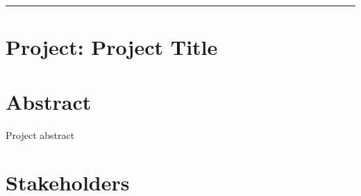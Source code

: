 \documentclass[10pt]{article}
\newcommand{\personName}{\large Project Proposal}
\newcommand{\addrA}{\large Universit\"at Bern}
\newcommand{\addrB}{\large Institut f\"ur Informatik und angewandte Mathematik}
\newcommand{\scg}{\large Software Composition Group}
\begin{document}
 


\begin{center}
\rule{\textwidth}{0.5pt}
\end{center}

\section*{Project: Project Title}

\section{Abstract}

Project abstract

\section{Stakeholders}
\end{document}
